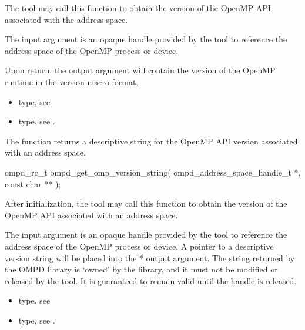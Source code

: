 \descr
The tool may call this function to obtain the version of the OpenMP API associated with the address space.

\argdesc
The input argument  is an opaque handle provided by the tool
to reference the address space of the OpenMP process or device.

Upon return, the output argument  will contain the version of the OpenMP runtime in the  version macro format.

\crossreferences
\begin{itemize}
	\item {} type, see 
	\item {} type, see .
\end{itemize}

\label{subsubsubsec:ompd_get_omp_version_string}

\summary
The  function returns a descriptive string for the OpenMP
API version associated with an address space.

\format

\begin{cspecific}
\begin{ompSyntax}
ompd_rc_t ompd_get_omp_version_string(
  ompd_address_space_handle_t *,
  const char **
);
\end{ompSyntax}
\end{cspecific}

\descr
After initialization, the tool may call this function to obtain the version of the OpenMP
API associated with an address space.

\argdesc
The input argument  is an opaque handle provided by the tool
to reference the address space of the OpenMP process or device.
A pointer to a descriptive version string will be placed into the * output argument.
The string returned by the
OMPD library is `owned' by the library, and it must not be modified or released by the tool.
It is guaranteed to remain valid until the  handle is released.

\crossreferences
\begin{itemize}
	\item {} type, see 
	\item {} type, see .
\end{itemize}

